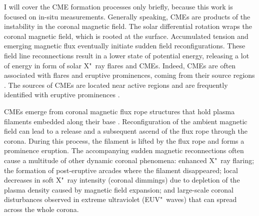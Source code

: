 I will cover the CME formation processes only briefly, because this work is focused on in-situ measurements. Generally speaking, CMEs are products of the instability in the coronal magnetic field. The solar differential rotation wraps the coronal magnetic field, which is rooted at the surface. Accumulated tension and emerging magnetic flux eventually initiate sudden field reconfigurations. These field line reconnections result in a lower state of potential energy, releasing a lot of energy in form of solar X"~ray flares and CMEs. Indeed, CMEs are often associated with flares and eruptive prominences, coming from their source regions \citep{Webb1987}. The sources of CMEs are located near active regions and are frequently identified with eruptive prominences \citep{Subramanian2001}.

CMEs emerge from coronal magnetic flux rope structures that hold plasma filaments embedded along their base \citep{Webb1987,Cremades2004}. Reconfiguration of the ambient magnetic field can lead to a release and a subsequent ascend of the flux rope through the corona. During this process, the filament is lifted by the flux rope and forms a prominence eruption. The accompanying sudden magnetic reconnections often cause a multitude of other dynamic coronal phenomena: enhanced X"~ray flaring; the formation of post-eruptive arcades where the filament disappeared; local decreases in soft X"~ray intensity (coronal dimmings) due to depletion of the plasma density caused by magnetic field expansion; and large-scale coronal disturbances observed in extreme ultraviolet (EUV"~waves) that can spread across the whole corona.

